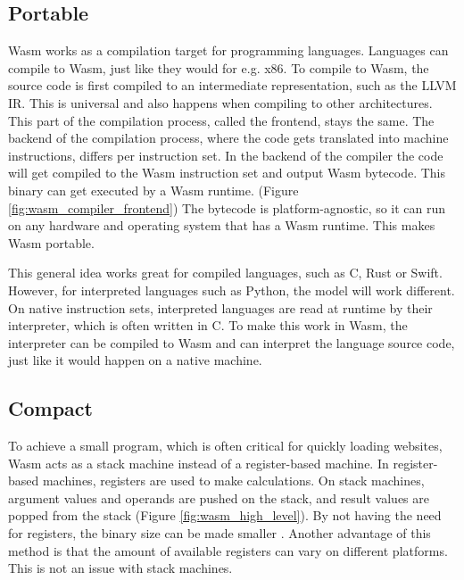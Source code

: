 \subsection{Portable}
\acrfull{Wasm} works as a compilation target for programming languages. Languages can compile to Wasm, just like they would for e.g. x86.
To compile to Wasm, the source code is first compiled to an intermediate representation, such as the LLVM IR. This is universal and also happens when compiling to other architectures. This part of the compilation process, called the frontend, stays the same. The backend of the compilation process, where the code gets translated into machine instructions, differs per instruction set. In the backend of the compiler the code will get compiled to the Wasm instruction set and output Wasm bytecode. This binary can get executed by a Wasm runtime. (Figure \ref{fig:wasm_compiler_frontend}) The bytecode is platform-agnostic, so it can run on any hardware and operating system that has a Wasm runtime. This makes Wasm portable.

This general idea works great for compiled languages, such as C, Rust or Swift. However, for interpreted languages such as Python, the model will work different. On native instruction sets, interpreted languages are read at runtime by their interpreter, which is often written in C. To make this work in Wasm, the interpreter can be compiled to Wasm and can interpret the language source code, just like it would happen on a native machine.

\subsection{Compact}
To achieve a small program, which is often critical for quickly loading websites, Wasm acts as a stack machine instead of a register-based machine. In register-based machines, registers are used to make calculations. On stack machines, argument values and operands are pushed on the stack, and result values are popped from the stack (Figure \ref{fig:wasm_high_level}). \cite{bringing_the_web_up_to_speed} By not having the need for registers, the binary size can be made smaller \cite{stack_vs_register_machine}. Another advantage of this method is that the amount of available registers can vary on different platforms. This is not an issue with stack machines.

